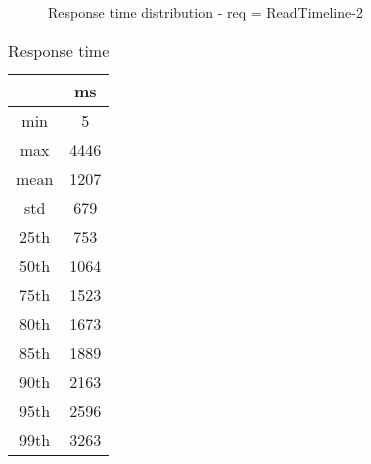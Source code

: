 \begin{minipage}{0.75\linewidth}
\begin{figure}[h]
\begin{adjustbox}{max width=1.0\linewidth, keepaspectratio}
  \end{adjustbox}
  \caption{Response time distribution - req = ReadTimeline-2}
\end{figure}
\end{minipage}\hfill\begin{minipage}{0.18\linewidth}
\begin{table}[h]
\begin{tabular}{|cc|}
\hline
\textbf{} & \textbf{ms}\\ \hline
 \Xhline{0.005\arrayrulewidth}
min & 5\\
 \Xhline{0.005\arrayrulewidth}
max & 4446\\
 \Xhline{0.005\arrayrulewidth}
mean & 1207\\
 \Xhline{0.005\arrayrulewidth}
std & 679\\
\hline
\hline
 \Xhline{0.005\arrayrulewidth}
25th & 753\\
 \Xhline{0.005\arrayrulewidth}
50th & 1064\\
 \Xhline{0.005\arrayrulewidth}
75th & 1523\\
 \Xhline{0.005\arrayrulewidth}
80th & 1673\\
 \Xhline{0.005\arrayrulewidth}
85th & 1889\\
 \Xhline{0.005\arrayrulewidth}
90th & 2163\\
 \Xhline{0.005\arrayrulewidth}
95th & 2596\\
 \Xhline{0.005\arrayrulewidth}
99th & 3263\\
\hline
\end{tabular}
\caption{Response time}
\end{table}
\end{minipage}\hfill